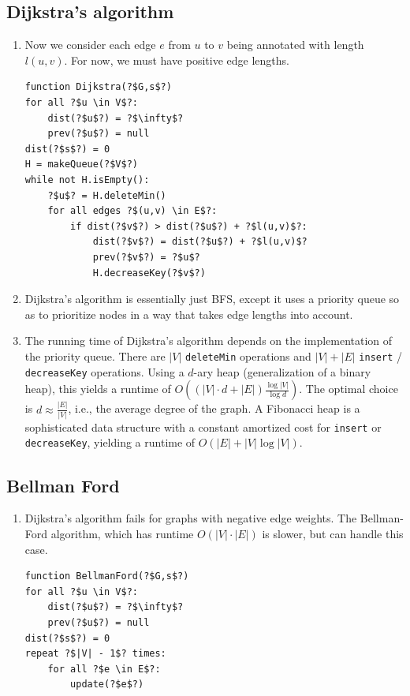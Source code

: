 \documentclass[10pt]{article}
\begin{document}
\begin{multicols}{2}
\begin{addmargin}[0.8em]{0.5em}
\begin{enumerate}[label=(\alph*)]
    \end{enumerate}
    
    \subsection{Dijkstra’s algorithm}
    \begin{enumerate}[label=(\alph*)]
        \item Now we consider each edge $e$ from $u$ to $v$ being annotated with length $l(u,v)$. For now, we must have positive edge lengths.
\begin{verbatim}
function Dijkstra(?$G,s$?)
for all ?$u \in V$?:
    dist(?$u$?) = ?$\infty$?
    prev(?$u$?) = null
dist(?$s$?) = 0
H = makeQueue(?$V$?)
while not H.isEmpty():
    ?$u$? = H.deleteMin()
    for all edges ?$(u,v) \in E$?:
        if dist(?$v$?) > dist(?$u$?) + ?$l(u,v)$?:
            dist(?$v$?) = dist(?$u$?) + ?$l(u,v)$?
            prev(?$v$?) = ?$u$?
            H.decreaseKey(?$v$?)
\end{verbatim}
\item Dijkstra’s algorithm is essentially just BFS, except it uses a priority queue so as to prioritize nodes in a way that takes edge lengths into account.
\item The running time of Dijkstra’s algorithm depends on the implementation of the priority queue. There are $|V|$ \texttt{deleteMin} operations and $|V| + |E|$ \texttt{insert} / \texttt{decreaseKey} operations. Using a $d$-ary heap (generalization of a binary heap), this yields a runtime of $O((|V| \cdot d + |E|) \frac{\log{|V|}}{\log{d}})$. The optimal choice is $d \approx \frac{|E|}{|V|}$, i.e., the average degree of the graph. A Fibonacci heap is a sophisticated data structure with a constant amortized cost for \texttt{insert} or \texttt{decreaseKey}, yielding a runtime of $O(|E| + |V|\log{|V|})$. 
    \end{enumerate}
    \subsection{Bellman Ford}
    \begin{enumerate}[label=(\alph*)]
        \item Dijkstra’s algorithm fails for graphs with negative edge weights. The Bellman-Ford algorithm, which has runtime $O(|V| \cdot |E|)$ is slower, but can handle this case.
\begin{verbatim}
function BellmanFord(?$G,s$?)
for all ?$u \in V$?:
    dist(?$u$?) = ?$\infty$?
    prev(?$u$?) = null
dist(?$s$?) = 0
repeat ?$|V| - 1$? times:
    for all ?$e \in E$?:
        update(?$e$?)
            

\end{verbatim}
\end{enumerate}
\end{addmargin}
\end{multicols}
\end{document}
